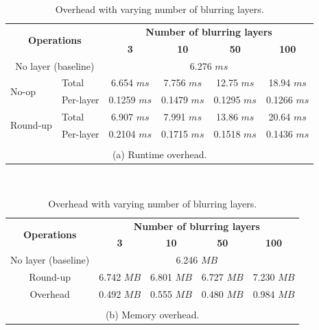 \begin{table}
\scriptsize
\centering

\bgroup
\def\arraystretch{1.15}%

\begin{tabular}{|l|l|c|c|c|c|}
\hline
\multicolumn{2}{|c|}{\multirow{2}{*}{\bf Operations}} & 
\multicolumn{4}{c|}{\bf Number of blurring layers} \\\cline{3-6}
\multicolumn{2}{|c|}{} & {\bf 3} & {\bf 10} & {\bf 50} & {\bf 100}\\\hline

\multicolumn{2}{|c|}{No layer (baseline)} & \multicolumn{4}{c|}{6.276 $ms$} \\\hline

\multirow{2}{*}{No-op} & Total & 6.654 $ms$ & 7.756 $ms$ & 12.75 $ms$ & 18.94 $ms$ \\ 
& Per-layer & 0.1259 $ms$ & 0.1479 $ms$ & 0.1295 $ms$ & 0.1266 $ms$ \\\hline

\multirow{2}{*}{Round-up} & Total & 6.907 $ms$ & 7.991 $ms$  & 13.86 $ms$ & 20.64 $ms$ \\ 
& Per-layer & 0.2104 $ms$ & 0.1715 $ms$ & 0.1518 $ms$ & 0.1436 $ms$ \\\hline 
\multicolumn{6}{c}{\vspace{-0.1cm}}\\

\multicolumn{6}{c}{\small (a) Runtime overhead.} \\
\end{tabular}\\\vspace{0.25cm}


\begin{tabular}{|l|l|c|c|c|c|}
\hline
\multicolumn{2}{|c|}{\multirow{2}{*}{\bf Operations}} & 
\multicolumn{4}{c|}{\bf Number of blurring layers} \\\cline{3-6}
\multicolumn{2}{|c|}{} & {\bf 3} & {\bf 10} & {\bf 50} & {\bf 100}\\\hline

\multicolumn{2}{|c|}{No layer (baseline)} & \multicolumn{4}{c|}{6.246 $MB$} \\\hline

\multicolumn{2}{|c|}{Round-up} & 6.742 $MB$ & 6.801 $MB$ & 6.727 $MB$ & 7.230 $MB$ \\\hline

\multicolumn{2}{|c|}{Overhead} & 0.492 $MB$ & 0.555 $MB$ & 0.480 $MB$ & 0.984 $MB$ \\\hline
\multicolumn{6}{c}{\vspace{-0.1cm}}\\

\multicolumn{6}{c}{\small (b) Memory overhead.} \\
\end{tabular}

\egroup

\caption{\small Overhead with varying number of blurring layers. }
\label{tab:overhead}
\end{table}


